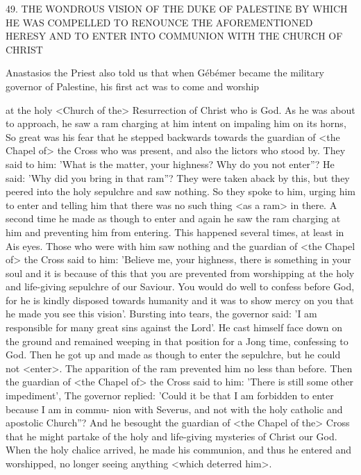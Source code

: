 49.
THE WONDROUS VISION OF THE DUKE OF
PALESTINE BY WHICH HE WAS COMPELLED
TO RENOUNCE THE AFOREMENTIONED HERESY
AND TO ENTER INTO COMMUNION
WITH THE CHURCH OF CHRIST

Anastasios the Priest also told us that when Gébémer became the
military governor of Palestine, his first act was to come and worship

at the holy <Church of the> Resurrection of Christ who is God.
As
he was about to approach, he saw a ram charging at him intent on
impaling him on its horns, So great was his fear that he stepped
backwards towards the guardian of <the Chapel of> the Cross who
was present, and also the lictors who stood by.
They said to him:
'What is the matter, your highness? Why do you not enter”? He
said: 'Why did you bring in that ram”? They were taken aback by
this, but they peered into the holy sepulchre and saw nothing.
So
they spoke to him, urging him to enter and telling him that there
was no such thing <as a ram> in there.
A second time he made as
though to enter and again he saw the ram charging at him and
preventing him from entering.
This happened several times, at least
in Ais eyes.
Those who were with him saw nothing and the guardian
of <the Chapel of> the Cross said to him: 'Believe me, your
highness, there is something in your soul and it is because of this
that you are prevented from worshipping at the holy and life-giving
sepulchre of our Saviour.
You would do well to confess before God,
for he is kindly disposed towards humanity and it was to show
mercy on you that he made you see this vision'.
Bursting into tears,
the governor said: 'I am responsible for many great sins against the
Lord'.
He cast himself face down on the ground and remained
weeping in that position for a Jong time, confessing to God.
Then
he got up and made as though to enter the sepulchre, but he could
not <enter>.
The apparition of the ram prevented him no less than
before.
Then the guardian of <the Chapel of> the Cross said to
him: 'There is still some other impediment', The governor replied:
'Could it be that I am forbidden to enter because I am in commu-
nion with Severus, and not with the holy catholic and apostolic
Church”? And he besought the guardian of <the Chapel of the>
Cross that he might partake of the holy and life-giving mysteries of
Christ our God.
When the holy chalice arrived, he made his
communion, and thus he entered and worshipped, no longer seeing
anything <which deterred him>.

